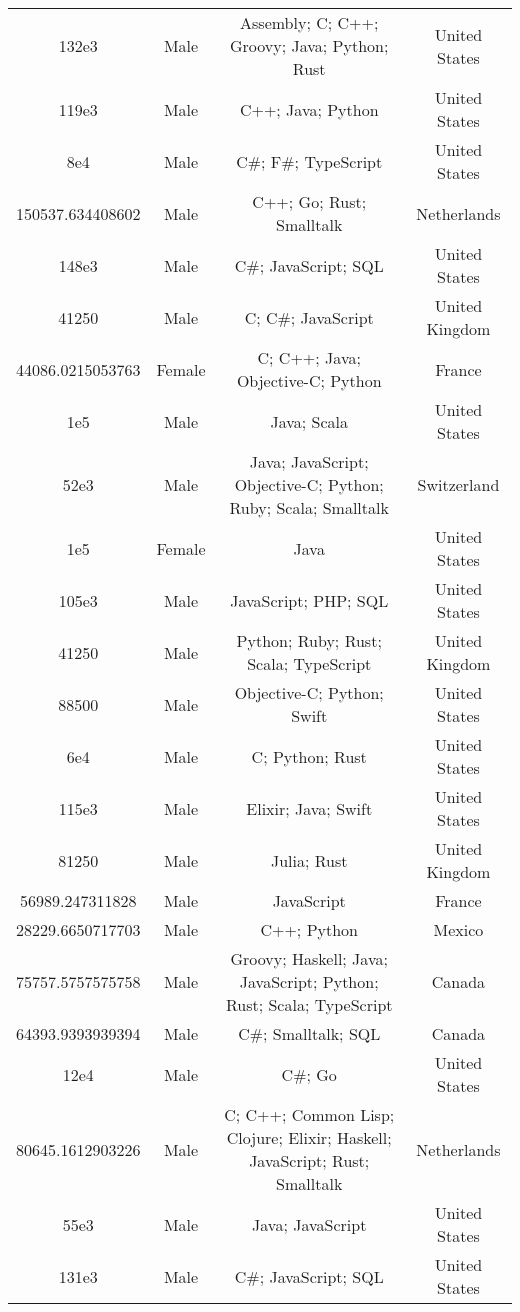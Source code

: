\begin{center}
\begin{tabular}{ |c|c|c|c| }
132e3  &  Male  &  Assembly; C; C++; Groovy; Java; Python; Rust  &  United States  \\ 
119e3  &  Male  &  C++; Java; Python  &  United States  \\ 
8e4  &  Male  &  C\#; F\#; TypeScript  &  United States  \\ 
150537.634408602  &  Male  &  C++; Go; Rust; Smalltalk  &  Netherlands  \\ 
148e3  &  Male  &  C\#; JavaScript; SQL  &  United States  \\ 
41250  &  Male  &  C; C\#; JavaScript  &  United Kingdom  \\ 
44086.0215053763  &  Female  &  C; C++; Java; Objective-C; Python  &  France  \\ 
1e5  &  Male  &  Java; Scala  &  United States  \\ 
52e3  &  Male  &  Java; JavaScript; Objective-C; Python; Ruby; Scala; Smalltalk  &  Switzerland  \\ 
1e5  &  Female  &  Java  &  United States  \\ 
105e3  &  Male  &  JavaScript; PHP; SQL  &  United States  \\ 
41250  &  Male  &  Python; Ruby; Rust; Scala; TypeScript  &  United Kingdom  \\ 
88500  &  Male  &  Objective-C; Python; Swift  &  United States  \\ 
6e4  &  Male  &  C; Python; Rust  &  United States  \\ 
115e3  &  Male  &  Elixir; Java; Swift  &  United States  \\ 
81250  &  Male  &  Julia; Rust  &  United Kingdom  \\ 
56989.247311828  &  Male  &  JavaScript  &  France  \\ 
28229.6650717703  &  Male  &  C++; Python  &  Mexico  \\ 
75757.5757575758  &  Male  &  Groovy; Haskell; Java; JavaScript; Python; Rust; Scala; TypeScript  &  Canada  \\ 
64393.9393939394  &  Male  &  C\#; Smalltalk; SQL  &  Canada  \\ 
12e4  &  Male  &  C\#; Go  &  United States  \\ 
80645.1612903226  &  Male  &  C; C++; Common Lisp; Clojure; Elixir; Haskell; JavaScript; Rust; Smalltalk  &  Netherlands  \\ 
55e3  &  Male  &  Java; JavaScript  &  United States  \\ 
131e3  &  Male  &  C\#; JavaScript; SQL  &  United States  \\ 

\end{tabular}
\end{center}
